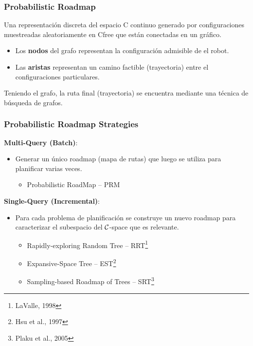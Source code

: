 \begin{frame}
	\frametitle{Probabilistic Roadmap}
	
	Una representación discreta del espacio C continuo generado
	por configuraciones muestreadas aleatoriamente en Cfree que están conectadas
	en un gráfico.
	\begin{itemize}
		\item Los {\bf nodos} del grafo representan la configuración admisible de
		el robot.
		\item Las {\bf aristas} representan un camino factible (trayectoria) entre el
		configuraciones particulares.
	\end{itemize}

	Teniendo el grafo, la ruta final (trayectoria) se encuentra mediante una técnica de búsqueda de grafos.
\end{frame}

\begin{frame}
	\frametitle{Probabilistic Roadmap Strategies}
	
	{\bf Multi-Query (Batch)}:
	\begin{itemize}
	\item Generar un único roadmap (mapa de rutas) que luego se utiliza para planificar varias veces.
		\begin{itemize}
			\item Probabilistic RoadMap – PRM
		\end{itemize}
	\end{itemize}

	{\bf Single-Query (Incremental)}:
	\begin{itemize}
		\item Para cada problema de planificación se construye un nuevo roadmap para
		caracterizar el subespacio del $\mathcal{C}$-space que es relevante.
		\begin{itemize}
			\item Rapidly-exploring Random Tree -- RRT\footnote{LaValle, 1998}
			\item Expansive-Space Tree -- EST\footnote{Hsu et al., 1997}
			\item Sampling-based Roadmap of Trees – SRT\footnote{Plaku et al., 2005}
		\end{itemize}
	\end{itemize}

\end{frame}

